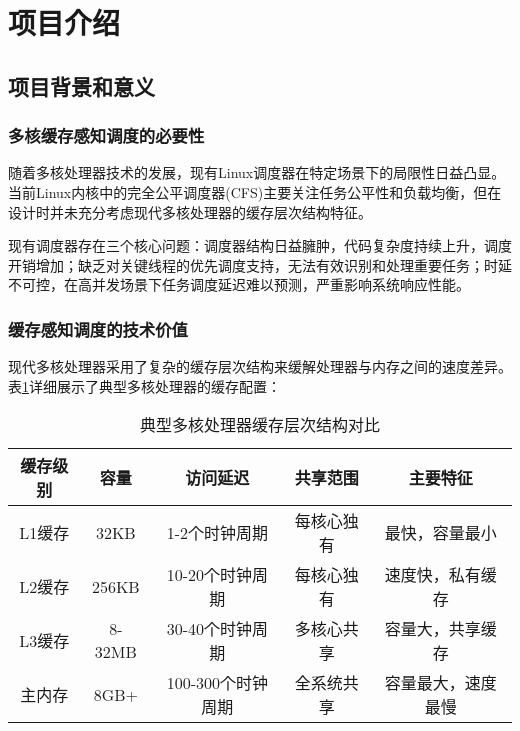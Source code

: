 

\section{项目介绍} \label{sec:intro}

\subsection{项目背景和意义}

\subsubsection{多核缓存感知调度的必要性}

随着多核处理器技术的发展，现有Linux调度器在特定场景下的局限性日益凸显。当前Linux内核中的完全公平调度器(CFS)主要关注任务公平性和负载均衡，但在设计时并未充分考虑现代多核处理器的缓存层次结构特征。


现有调度器存在三个核心问题：调度器结构日益臃肿，代码复杂度持续上升，调度开销增加；缺乏对关键线程的优先调度支持，无法有效识别和处理重要任务；时延不可控，在高并发场景下任务调度延迟难以预测，严重影响系统响应性能。\cite{r5_Fair_scheduling_algorithm}

\subsubsection{缓存感知调度的技术价值}

现代多核处理器采用了复杂的缓存层次结构来缓解处理器与内存之间的速度差异。\cite{r2_A_shared_cache-aware_Task_scheduling_strategy}表\ref{tab:cache-hierarchy}详细展示了典型多核处理器的缓存配置：

\begin{table}[h]
\centering
\begin{tabular}{ccccc}
\toprule
缓存级别 & 容量 & 访问延迟 & 共享范围 & 主要特征 \\
\midrule
L1缓存 & 32KB & 1-2个时钟周期 & 每核心独有 & 最快，容量最小 \\
L2缓存 & 256KB & 10-20个时钟周期 & 每核心独有 & 速度快，私有缓存 \\
L3缓存 & 8-32MB & 30-40个时钟周期 & 多核心共享 & 容量大，共享缓存 \\
主内存 & 8GB+ & 100-300个时钟周期 & 全系统共享 & 容量最大，速度最慢 \\
\bottomrule
\end{tabular}
\caption{典型多核处理器缓存层次结构对比}
\label{tab:cache-hierarchy}
\end{table}

